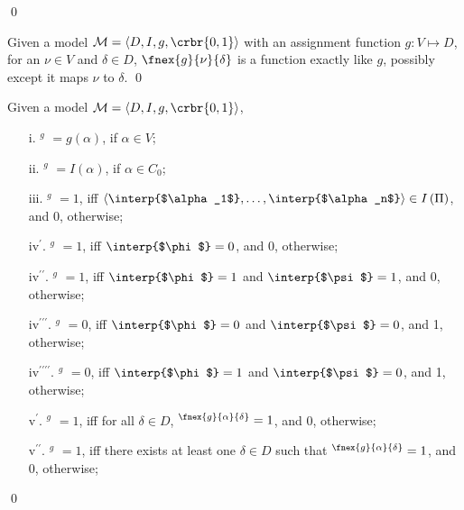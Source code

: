 \documentclass[11pt]{article}
\begin{document}
{\begin{udefinition}[Model]
\qed
\end{udefinition}


\begin{udefinition}
Given a model $\mathcal{M} = \langle D,I,g,\crbr{0,1} \rangle$ with an assignment function $g: V \mapsto D$, for an $\nu \in V$ and $\delta \in D $, $\fnex{g}{\nu}{\delta}$ is a function exactly like $g$, possibly except it maps $\nu$ to $\delta$.
\qed
\end{udefinition}

\begin{udefinition}
Given a model $\mathcal{M} = \langle D,I,g,\crbr{0,1} \rangle$,

\begin{itemize}
\item[i.]  \interp{$\alpha$}$^g$ $= {g(\alpha)}$, if $\alpha\in V$;
\item[ii.]  \interp{$\alpha$}$^g$ $=  I(\alpha)$, if $\alpha\in C_0$;
\item[iii.] $^g$ $= 1$, iff $\langle\interp{$\alpha_1$},\ldots,\interp{$\alpha_n$}\rangle \in I \left( \Pi \right)$, and  0, otherwise; 
\item[iv$^\prime$.] \interp{$(\neg\phi)$}$^g$ $= 1$, iff $\interp{$\phi$} = 0$, and 0, otherwise;
\item[iv$^{\prime\prime}$.] \interp{$(\phi \land \psi)$}$^g$ $= 1$, iff $\interp{$\phi$} = 1$  and $\interp{$\psi$} = 1$, and 0, otherwise;
\item[iv$^{\prime\prime\prime}$.] \interp{$(\phi \lor \psi)$}$^g$ $= 0$, iff $\interp{$\phi$} = 0$  and $\interp{$\psi$} = 0$, and 1, otherwise;
\item[iv$^{\prime\prime\prime\prime}$.] \interp{$(\phi \cond \psi)$}$^g$ $= 0$, iff $\interp{$\phi$} = 1$  and $\interp{$\psi$} = 0$, and 1, otherwise;
 \item[v$^\prime$.] \interp{$\forall\alpha\phi$}$^g$ $= 1$, iff for all $\delta\in D$, \interp{$\phi$}$^\fnex{g}{\alpha}{\delta} = 1$, and 0, otherwise; 
 \item[v$^{\prime\prime}$.] \interp{$\exists\alpha\phi$}$^g$ $= 1$, iff there exists at least one $\delta\in D$ such that \interp{$\phi$}$^\fnex{g}{\alpha}{\delta} = 1$, and 0, otherwise; 
\end{itemize}

\qed
\end{udefinition}



}
\end{document}
